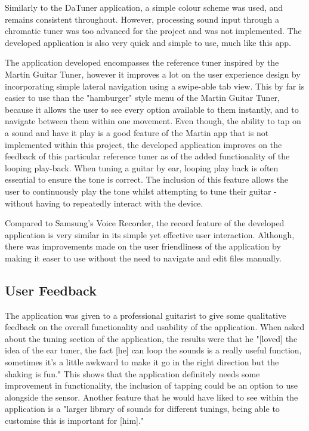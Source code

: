 \documentclass[conference]{acmsiggraph}
\begin{document}
Similarly to the DaTuner application, a simple colour scheme was used, and remains consistent throughout. However, processing sound input through a chromatic tuner was too advanced for the project and was not implemented. The developed application is also very quick and simple to use, much like this app.

The application developed encompasses the reference tuner inspired by the Martin Guitar Tuner, however it improves a lot on the user experience design by incorporating simple lateral navigation using a swipe-able tab view. This by far is easier to use than the "hamburger" style menu of the Martin Guitar Tuner, because it allows the user to see every option available to them instantly, and to navigate between them within one movement. Even though, the ability to tap on a sound and have it play is a good feature of the Martin app that is not implemented within this project, the developed application improves on the feedback of this particular reference tuner as of the added functionality of the looping play-back. When tuning a guitar by ear, looping play back is often essential to ensure the tone is correct. The inclusion of this feature allows the user to continuously play the tone whilst attempting to tune their guitar - without having to repeatedly interact with the device.

Compared to Samsung's Voice Recorder, the record feature of the developed application is very similar in its simple yet effective user interaction. Although, there was improvements made on the user friendliness of the application by making it easer to use without the need to navigate and edit files manually.

\subsection{User Feedback}

The application was given to a professional guitarist to give some qualitative feedback on the overall functionality and usability of the application. When asked about the tuning section of the application, the results were that he "[loved] the idea of the ear tuner, the fact [he] can loop the sounds is a really useful function, sometimes it's a little awkward to make it go in the right direction but the shaking is fun." This shows that the application definitely needs some improvement in functionality, the inclusion of tapping could be an option to use alongside the sensor. Another feature that he would have liked to see within the application is a "larger library of sounds for different tunings, being able to customise this is important for [him]."
\end{document}
